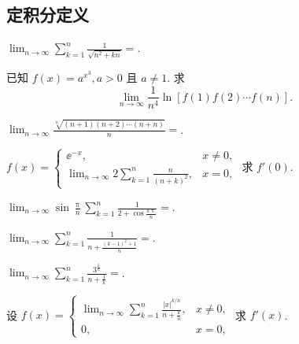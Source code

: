 \subsection{定积分定义}

	\begin{ti}
		$\lim_{n \to \infty} \sum_{k=1}^{n} \frac{1}{\sqrt{n^{2} + kn}} = $.
	\end{ti}

	\begin{ti}
		已知 $f(x) = a^{x^{3}}, a > 0$ 且 $a \ne 1$. 求
		\[
			\lim_{n \to \infty} \frac{1}{n^{4}}  \ln \left[ f(1) f(2) \cdots f(n) \right].
		\]
	\end{ti}

	\begin{ti}
		$\lim_{n \to \infty} \frac{\sqrt[n]{(n + 1) (n + 2) \cdots (n + n)}}{n} = $\hone{4}.
	\end{ti}

	\begin{ti}
		$f(x) = \begin{cases}
			\ee^{-x}, & x \ne 0,\\
			\lim_{n \to \infty} 2 \sum_{k=1}^{n} \frac{n}{(n + k)^{2}}, & x = 0,
		\end{cases}$ 求 $f'(0)$.
	\end{ti}

	\begin{ti}
		$\lim_{n \to \infty} \sin \frac{\uppi}{n} \sum_{k=1}^{n} \frac{1}{2 + \cos \frac{k \uppi}{n}} = $.
	\end{ti}

	\begin{ti}
		$\lim_{n \to \infty} \sum_{k=1}^{n} \frac{1}{n + \frac{(k - 1)^{2} + 1}{n}} = $\hone{4}.
	\end{ti}

	\begin{ti}
		$\lim_{n \to \infty} \sum_{k=1}^{n} \frac{3^{\frac{k}{n}}}{n + \frac{1}{k}} = $\hone{4}.
	\end{ti}

	\begin{ti}
		设 $f(x) = \begin{cases}
			\lim_{n \to \infty} \sum_{k=1}^{n} \frac{|x|^{k/n}}{n + \frac{k}{n}}, & x \ne 0,\\
			0, & x = 0,
		\end{cases}$ 求 $f'(x)$.
	\end{ti}